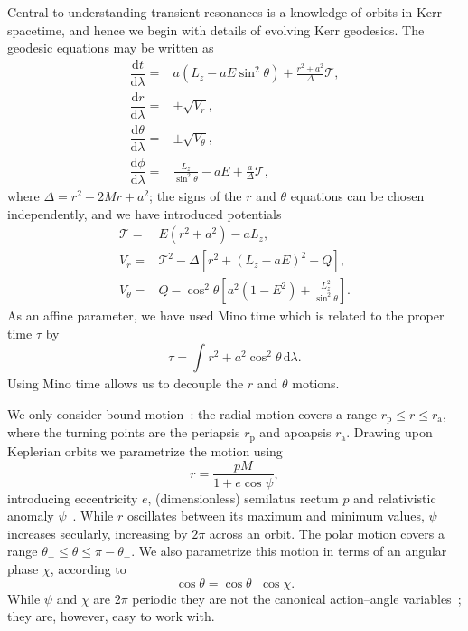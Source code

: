 \documentclass[aps,prd,amsfonts,amssymb,amsmath,nofootinbib,showpacs,superscriptaddress,twocolumn,floatfix]{revtex4-1}
\newcommand{\sub}[1]{\ensuremath{_\mathrm{#1}}}
\newcommand{\dd}{\ensuremath{\mathrm{d}}}
\newcommand{\diff}[2]{\ensuremath{\dfrac{\dd {#1}}{\dd {#2}}}}
\newcommand{\intd}[4]{\ensuremath{\int_{#1}^{#2}{#3}\,\dd{#4}}}
\begin{document}
Central to understanding transient resonances is a knowledge of orbits in Kerr spacetime, and hence we begin with details of evolving Kerr geodesics. The geodesic equations may be written as~\cite{Carter1968, Chandrasekhar1992} %
\begin{subequations}
\begin{align}
\diff{t}{\lambda} = {} & a\left(L_z - aE\sin^2 \theta\right) + \frac{r^2 + a^2}{\Delta}\mathcal{T},\\
\diff{r}{\lambda} = {} & \pm \sqrt{V_r},\\
\diff{\theta}{\lambda} = {} & \pm \sqrt{V_\theta},\\
\diff{\phi}{\lambda} = {} & \frac{L_z}{\sin^2 \theta} - aE + \frac{a}{\Delta}\mathcal{T},
\end{align}
\end{subequations}
where $\Delta = r^2 - 2M r + a^2$; the signs of the $r$ and $\theta$ equations can be chosen independently, and we have introduced potentials
\begin{subequations}
\begin{align}
\mathcal{T} = {} & E\left(r^2 +a^2\right) - aL_z,\\
V_r = {} & \mathcal{T}^2 - \Delta\left[r^2 + \left(L_z -aE\right)^2 + Q\right],\\
V_\theta = {} & Q - \cos^2 \theta\left[a^2\left(1 - E^2\right) + {\displaystyle \frac{L_z^2}{\sin^2\theta}}\right].
\end{align}
\end{subequations}
As an affine parameter, we have used Mino time which is related to the proper time $\tau$ by~\cite{Mino2003}
\begin{equation}
\tau = \intd{}{}{r^2 + a^2 \cos^2\theta}{\lambda}.
\end{equation}
Using Mino time allows us to decouple the $r$ and $\theta$ motions.

We only consider bound motion~\cite{Wilkins1972}: the radial motion covers a range $r\sub{p} \leq r \leq r\sub{a}$, where the turning points are the periapsis $r\sub{p}$ and apoapsis $r\sub{a}$. Drawing upon Keplerian orbits we parametrize the motion using
\begin{equation}
r = \frac{p M}{1+e\cos\psi},
\end{equation}
introducing eccentricity $e$, (dimensionless) semilatus rectum $p$ and relativistic anomaly $\psi$~\cite{Darwin1961,Drasco2004}. While $r$ oscillates between its maximum and minimum values, $\psi$ increases secularly, increasing by $2\pi$ across an orbit. The polar motion covers a range $\theta_- \leq \theta \leq \pi - \theta_-$. We also parametrize this motion in terms of an angular phase $\chi$, according to~\cite{Hughes2000}
\begin{equation}
\cos\theta = \cos\theta_-\cos\chi.
\end{equation}
While $\psi$ and $\chi$ are $2\pi$ periodic they are not the canonical action--angle variables~\cite{Schmidt2002}; they are, however, easy to work with.
\end{document}
